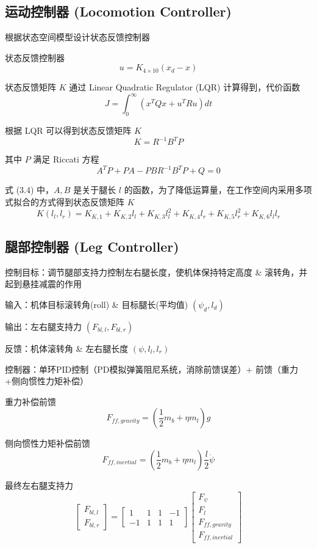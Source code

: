 \subsection{运动控制器 (Locomotion Controller)}
根据状态空间模型设计状态反馈控制器

状态反馈控制器
\begin{equation}
u = K_{4 \times 10}(x_d - x) 
\end{equation}

状态反馈矩阵 $K$ 通过 Linear Quadratic Regulator (LQR) 计算得到，代价函数
\begin{equation}
J = \int_{0}^{\infty} (x^T Q x + u^T R u) dt 
\end{equation}

根据 LQR 可以得到状态反馈矩阵 $K$
\begin{equation}
K = R^{-1} B^T P 
\end{equation}

其中 $P$ 满足 Riccati 方程
\begin{equation}
A^T P + P A - P B R^{-1} B^T P + Q = 0 
\end{equation}

式 (3.4) 中，$A, B$ 是关于腿长 $l$ 的函数，为了降低运算量，在工作空间内采用多项式拟合的方式得到状态反馈矩阵 $K$
\begin{equation}
K(l_l, l_r) = K_{K,1} + K_{K,2} l_l + K_{K,3} l_l^2 + K_{K,4} l_r + K_{K,5} l_r^2 + K_{K,6} l_l l_r 
\end{equation}

\subsection{腿部控制器 (Leg Controller)}
控制目标：调节腿部支持力控制左右腿长度，使机体保持特定高度 \& 滚转角，并起到悬挂减震的作用

输入：机体目标滚转角(roll) \& 目标腿长(平均值) $(\psi_d, l_d)$

输出：左右腿支持力 $(F_{bl,l}, F_{bl,r})$

反馈：机体滚转角 \& 左右腿长度 $(\psi, l_l, l_r)$

控制器：单环PID控制（PD模拟弹簧阻尼系统，消除前馈误差）+ 前馈（重力+侧向惯性力矩补偿）

重力补偿前馈
\begin{equation}
F_{ff,gravity} = \left(\frac{1}{2}m_b + \eta m_l\right)g 
\end{equation}

侧向惯性力矩补偿前馈
\begin{equation}
F_{ff,inertial} = \left(\frac{1}{2}m_b + \eta m_l\right) \frac{l}{2} \ddot{\psi} 
\end{equation}

最终左右腿支持力
\begin{equation}
\begin{bmatrix}
F_{bl,l} \\
F_{bl,r}
\end{bmatrix} = 
\begin{bmatrix}
1 & 1 & 1 & -1 \\
-1 & 1 & 1 & 1
\end{bmatrix}
\begin{bmatrix}
F_\psi \\
F_l \\
F_{ff,gravity} \\
F_{ff,inertial}
\end{bmatrix}
\end{equation}